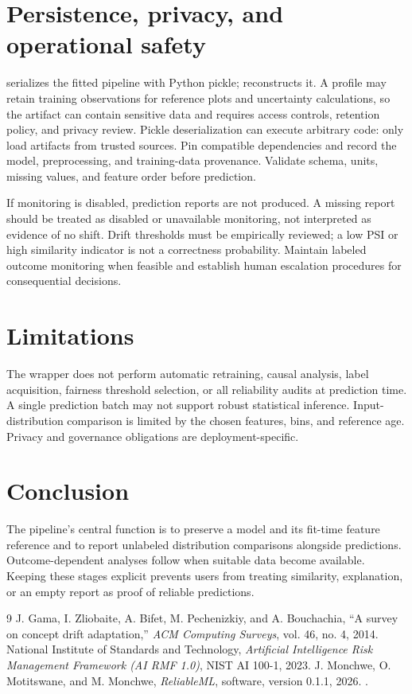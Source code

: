 \documentclass[conference]{IEEEtran}
\begin{document}
\section{Persistence, privacy, and operational safety}
 serializes the fitted pipeline with Python pickle;  reconstructs it. A profile may retain training observations for reference plots and uncertainty calculations, so the artifact can contain sensitive data and requires access controls, retention policy, and privacy review. Pickle deserialization can execute arbitrary code: only load artifacts from trusted sources. Pin compatible dependencies and record the model, preprocessing, and training-data provenance. Validate schema, units, missing values, and feature order before prediction.

If monitoring is disabled, prediction reports are not produced. A missing report should be treated as disabled or unavailable monitoring, not interpreted as evidence of no shift. Drift thresholds must be empirically reviewed; a low PSI or high similarity indicator is not a correctness probability. Maintain labeled outcome monitoring when feasible and establish human escalation procedures for consequential decisions.

\section{Limitations}
The wrapper does not perform automatic retraining, causal analysis, label acquisition, fairness threshold selection, or all reliability audits at prediction time. A single prediction batch may not support robust statistical inference. Input-distribution comparison is limited by the chosen features, bins, and reference age. Privacy and governance obligations are deployment-specific.

\section{Conclusion}
The pipeline's central function is to preserve a model and its fit-time feature reference and to report unlabeled distribution comparisons alongside predictions. Outcome-dependent analyses follow when suitable data become available. Keeping these stages explicit prevents users from treating similarity, explanation, or an empty report as proof of reliable predictions.

\begin{thebibliography}{9}
 J. Gama, I. Zliobaite, A. Bifet, M. Pechenizkiy, and A. Bouchachia, ``A survey on concept drift adaptation,'' \emph{ACM Computing Surveys}, vol. 46, no. 4, 2014.
 National Institute of Standards and Technology, \emph{Artificial Intelligence Risk Management Framework (AI RMF 1.0)}, NIST AI 100-1, 2023.
 J. Monchwe, O. Motitswane, and M. Monchwe, \emph{ReliableML}, software, version 0.1.1, 2026. \projecturl.
\end{thebibliography}
\end{document}
